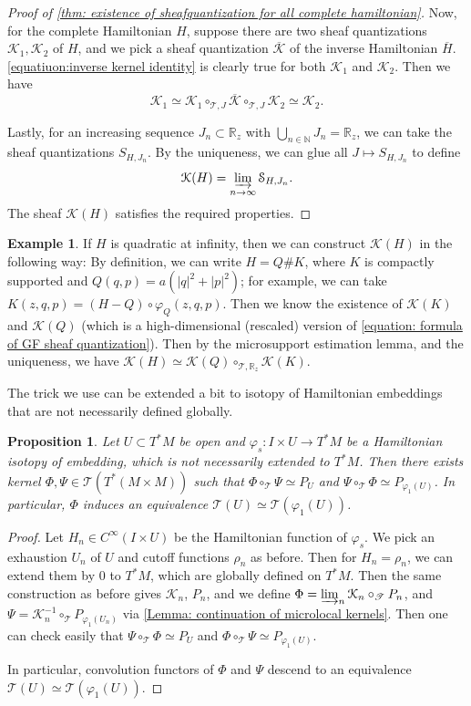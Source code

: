 \documentclass[11pt]{amsart}
\numberwithin{equation}{section}
\theoremstyle{plain}
\newtheorem{Prop}[prop]{Proposition}
\theoremstyle{definition}
\newtheorem{eg}[Eg]{Example}
\theoremstyle{remark}
\newcommand{\bR} { {\mathbb{R}}}
\newcommand{\bN} { {\mathbb{N}}}
\newcommand{\cK} { {\mathcal{K}}}
\newcommand{\cS} { {\mathcal{S}}}
\newcommand{\sT} { {\mathscr{T}}}
\begin{document}
\begin{proof}[Proof of \autoref{thm: existence of sheafquantization for all complete hamiltonian}]
Now, for the complete Hamiltonian $H$, suppose there are two sheaf quantizations $\cK_1,\cK_2$ of $H$, and we pick a sheaf quantization $\overline{\cK}$ of the inverse Hamiltonian $\overline{H}$. \autoref{equatiuon:inverse kernel identity} is clearly true for both $\cK_1$ and $\cK_2$. Then we have  
\[\cK_1\simeq \cK_1\circ_{\sT,J} \overline{\cK} \circ_{\sT,J} \cK_2  \simeq \cK_2.\]

Lastly, for an increasing sequence $J_n\subset \bR_z$ with $\bigcup_{n\in\bN} J_n=\bR_z$, we can take the sheaf quantizations $S_{H,J_n}$. By the uniqueness, we can glue all $J\mapsto S_{H,J_n}$ to define
\[\cK(H)=\varinjlim_{n\to\infty} \cS_{H,J_n}.\]
The sheaf $\cK(H)$ satisfies the required properties.
\end{proof}

\begin{eg}If $H$ is quadratic at infinity, then we can construct $\cK(H)$ in the following way: By definition, we can write $H=Q\#K$, where $K$ is compactly supported and $Q(q,p)=a(|q|^2+|p|^2)$; for example, we can take $K(z,q,p)=(H-Q)\circ \varphi_Q(z,q,p)$. Then we know the existence of $\cK(K)$ and $\cK(Q)$ (which is a high-dimensional (rescaled) version of \autoref{equation: formula of GF sheaf quantization}). Then by the microsupport estimation lemma, and the uniqueness, we have
$\cK(H)\simeq \cK(Q)\circ_{\sT,\bR_z}\cK(K)$.    
\end{eg}

The trick we use can be extended a bit to isotopy of Hamiltonian embeddings that are not necessarily defined globally. 
\begin{Prop}\label{appendix: Hamiltonian embedding}Let $U\subset T^*M$ be open and $\varphi_s:I\times U\to T^*M$ be a Hamiltonian isotopy of embedding, which is not necessarily extended to $T^*M$. Then there exists kernel $\Phi,\Psi\in \sT(T^*(M\times M))$ such that $\Phi{\circ_\sT} \Psi\simeq P_U$ and $\Psi{\circ_\sT} \Phi\simeq P_{\varphi_1(U)}$. In particular, $\Phi$ induces an equivalence $\sT(U)\simeq \sT(\varphi_1(U))$. 
\end{Prop}
\begin{proof}Let $H_n\in C^\infty(I\times U)$ be the Hamiltonian function of $\varphi_s$. We pick an exhaustion $U_n$ of $U$ and cutoff functions $\rho_n$ as before. Then for $H_n=\rho_n$, we can extend them by $0$ to $T^*M$, which are globally defined on $T^*M$. Then the same construction as before gives $\cK_n$, $P_n$, and we define $\Phi=\varinjlim_n \cK_n \circ_\sT P_n$, and $\Psi= \cK_n^{-1}\circ_\sT P_{\varphi_1(U_n)}$ via \autoref{Lemma: continuation of microlocal kernels}. Then one can check easily that $\Psi{\circ_\sT} \Phi\simeq P_U$ and $\Phi{\circ_\sT} \Psi\simeq P_{\varphi_1(U)}$. 

In particular, convolution functors of $\Phi$ and $\Psi$ descend to an equivalence $\sT(U)\simeq \sT(\varphi_1(U))$.    
\end{proof}
\end{document}

